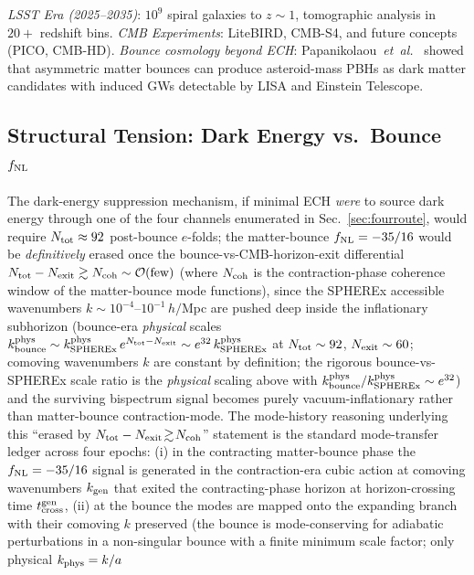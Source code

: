 \documentclass[aps,prd,twocolumn,superscriptaddress,showpacs,preprintnumbers,nofootinbib,longbibliography,floatfix]{revtex4-2}
\newcommand{\etal}{\textit{et~al.}}
\newcommand{\fnl}{f_{\rm NL}}
\begin{document}
\textit{LSST Era (2025--2035)}: $10^9$ spiral galaxies to $z\sim 1$, tomographic
analysis in $20+$ redshift bins.
\textit{CMB Experiments}: LiteBIRD, CMB-S4, and future concepts (PICO, CMB-HD).
\textit{Bounce cosmology beyond ECH}: Papanikolaou~\etal~\cite{Papanikolaou:2024pbh}
showed that asymmetric matter bounces can produce asteroid-mass PBHs as dark matter
candidates with induced GWs detectable by LISA and Einstein Telescope.

\subsection{Structural Tension: Dark Energy vs.\ Bounce $\fnl$}\label{sec:structural_tension}

The dark-energy suppression mechanism, if minimal ECH \emph{were} to source
dark energy through one of the four channels enumerated in
Sec.~\ref{sec:fourroute}, would require $N_{\rm tot}\approx 92$ post-bounce
$e$-folds; the matter-bounce $\fnl=-35/16$ would be \emph{definitively}
erased once the bounce-vs-CMB-horizon-exit differential $N_{\rm tot}-N_{\rm exit}\gtrsim N_{\rm coh}\sim\mathcal{O}(\text{few})$ (where $N_{\rm coh}$ is the contraction-phase coherence window of the matter-bounce mode functions), since the SPHEREx accessible
wavenumbers $k\sim 10^{-4}$--$10^{-1}\,h/$Mpc are pushed deep inside the
inflationary subhorizon (bounce-era \emph{physical} scales $k_{\rm bounce}^{\rm phys}\sim k_{\rm SPHEREx}^{\rm phys}\,e^{N_{\rm tot}-N_{\rm exit}}\sim e^{32}\,k_{\rm SPHEREx}^{\rm phys}$ at $N_{\rm tot}\sim 92$, $N_{\rm exit}\sim 60$; comoving wavenumbers $k$ are constant by definition; the rigorous bounce-vs-SPHEREx scale ratio is the \emph{physical} scaling above with $k_{\rm bounce}^{\rm phys}/k_{\rm SPHEREx}^{\rm phys} \sim e^{32}$) and the surviving bispectrum signal
becomes purely vacuum-inflationary rather than matter-bounce
contraction-mode. The mode-history reasoning underlying this
``erased by $N_{\rm tot}-N_{\rm exit}\!\gtrsim\!N_{\rm coh}$'' statement is the standard
mode-transfer ledger across four epochs: (i) in the contracting
matter-bounce phase the $\fnl=-35/16$ signal is generated in the
contraction-era cubic action at comoving wavenumbers $k_{\rm gen}$
that exited the contracting-phase horizon at horizon-crossing time
$t_{\rm cross}^{\rm gen}$, (ii) at the bounce the modes are mapped onto
the expanding branch with their comoving $k$ preserved (the bounce is
mode-conserving for adiabatic perturbations in a non-singular bounce
with a finite minimum scale factor; only physical $k_{\rm phys}=k/a$
\end{document}
